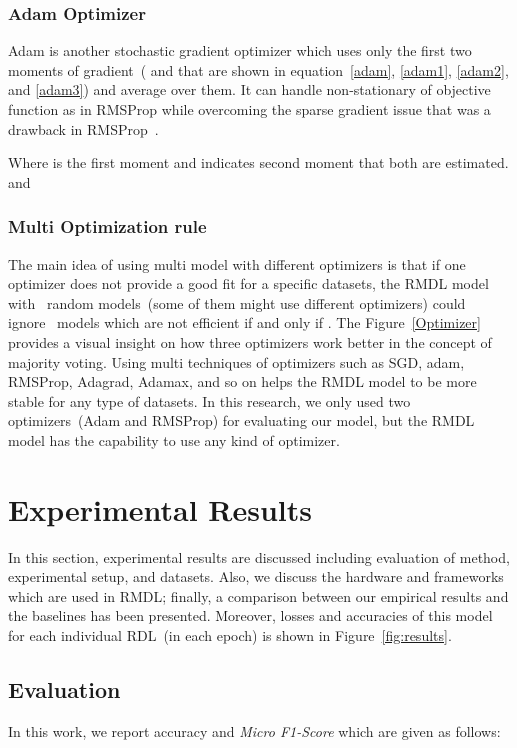 \documentclass[sigconf, final]{acmart}
\begin{document}
\subsubsection{Adam Optimizer}
Adam is another stochastic gradient optimizer which uses only the first two moments of gradient~( and  that are shown in equation~\ref{adam},   \ref{adam1}, \ref{adam2}, and \ref{adam3}) and average over them. It can handle non-stationary of objective function as in RMSProp while overcoming the sparse gradient issue that was a drawback in RMSProp~\cite{kingma2014adam}.

Where  is the first moment and  indicates second moment that both are estimated.  and 

\subsubsection{Multi Optimization rule}
The main idea of using multi model with different optimizers is that if one optimizer does not provide a good fit for a specific datasets, the RMDL model with~ random models~(some of them might use different optimizers) could ignore~ models which are not efficient if and only if . The Figure~\ref{Optimizer} provides a visual insight on how three optimizers work better in the concept of majority voting. Using multi techniques of optimizers such as SGD, adam, RMSProp, Adagrad, Adamax, and so on helps the RMDL model to be more stable for any type of datasets. In this research, we only used two optimizers~(Adam and RMSProp) for evaluating our model, but the RMDL model has the capability to use any kind of optimizer.  




\section{Experimental Results}\label{sec:results}
In this section, experimental results are discussed including evaluation of method, experimental setup, and datasets. Also, we discuss the hardware and frameworks which are used in RMDL; finally, a comparison between our empirical results and the baselines has been presented. Moreover, losses and accuracies of this model for each individual RDL~(in each epoch) is shown in Figure~\ref{fig:results}.

\subsection{Evaluation}\label{subsec:Evaluation}
In this work, we report accuracy and \textit{Micro F1-Score} which are given as follows:
\end{document}
